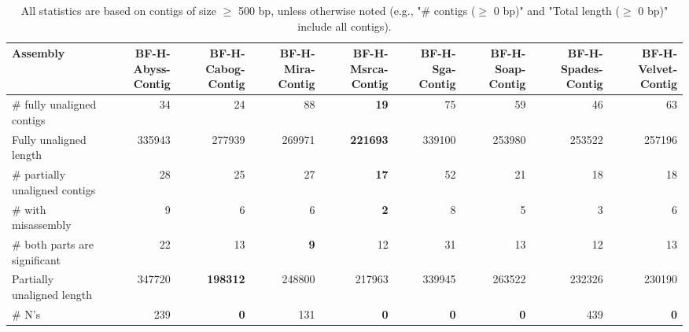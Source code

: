\documentclass[12pt,a4paper]{article}
\begin{document}
\begin{table}[ht]
\begin{center}
\caption{All statistics are based on contigs of size $\geq$ 500 bp, unless otherwise noted (e.g., "\# contigs ($\geq$ 0 bp)" and "Total length ($\geq$ 0 bp)" include all contigs).}
\begin{tabular}{|l*{8}{|r}|}
\hline
Assembly & BF-H-Abyss-Contig & BF-H-Cabog-Contig & BF-H-Mira-Contig & BF-H-Msrca-Contig & BF-H-Sga-Contig & BF-H-Soap-Contig & BF-H-Spades-Contig & BF-H-Velvet-Contig \\ \hline
\# fully unaligned contigs & 34 & 24 & 88 & {\bf 19} & 75 & 59 & 46 & 63 \\ \hline
Fully unaligned length & 335943 & 277939 & 269971 & {\bf 221693} & 339100 & 253980 & 253522 & 257196 \\ \hline
\# partially unaligned contigs & 28 & 25 & 27 & {\bf 17} & 52 & 21 & 18 & 18 \\ \hline
\hspace{5mm}\# with misassembly & 9 & 6 & 6 & {\bf 2} & 8 & 5 & 3 & 6 \\ \hline
\hspace{5mm}\# both parts are significant & 22 & 13 & {\bf 9} & 12 & 31 & 13 & 12 & 13 \\ \hline
Partially unaligned length & 347720 & {\bf 198312} & 248800 & 217963 & 339945 & 263522 & 232326 & 230190 \\ \hline
\# N's & 239 & {\bf 0} & 131 & {\bf 0} & {\bf 0} & {\bf 0} & 439 & {\bf 0} \\ \hline
\end{tabular}
\end{center}
\end{table}
\end{document}
